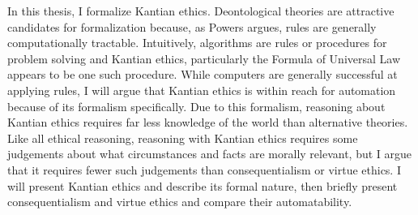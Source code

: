 %
\begin{isabellebody}%
%
%
\isadelimtheory
%
\endisadelimtheory
%
\isatagtheory
%
\endisatagtheory
{\isafoldtheory}%
%
\isadelimtheory
%
\endisadelimtheory
%
\isadelimdocument
%
\endisadelimdocument
%
\isatagdocument
%
\isamarkuptrue%
%
\endisatagdocument
{\isafolddocument}%
%
\isadelimdocument
%
\endisadelimdocument
%
\begin{isamarkuptext}%
In this thesis, I formalize Kantian ethics. Deontological theories are attractive candidates for formalization
because, as Powers argues, rules are generally computationally tractable. Intuitively, algorithms are 
rules or procedures for problem solving and Kantian ethics, particularly the Formula of Universal Law
appears to be one such procedure. While computers are generally successful at applying rules, I will 
argue that Kantian ethics is within reach for automation because of its formalism specifically. Due to 
this formalism, reasoning about Kantian ethics requires far less knowledge of the world than alternative
theories. Like all ethical reasoning, reasoning with Kantian ethics requires some judgements about what 
circumstances and facts are morally relevant, but I argue that it requires fewer such judgements than 
consequentialism or virtue ethics. I will present Kantian ethics and describe its formal nature, then briefly
present consequentialism and virtue ethics and compare their automatability. 


\end{isamarkuptext}
\end{isabellebody}
